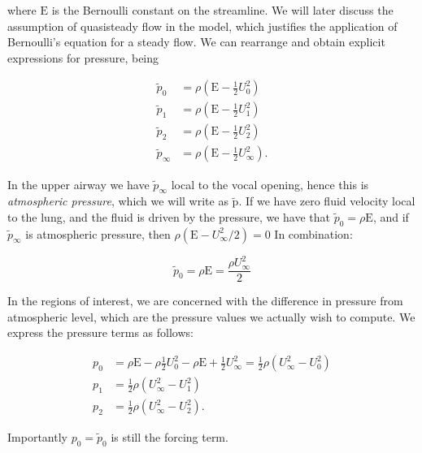 \documentclass{article}
\begin{document}
\noindent where $\mathrm{E}$ is the Bernoulli constant on the streamline.
We will later discuss the assumption of quasisteady flow in the model,
which justifies the application of Bernoulli's equation for a steady flow.
We can rearrange and obtain explicit expressions for pressure, being

\begin{equation}
    \begin{aligned}
        \tilde{p}_0 &= \rho\left(\mathrm{E} - \frac{1}{2}U_0^2\right) \\
        \tilde{p}_1 &= \rho\left(\mathrm{E} - \frac{1}{2}U_1^2\right) \\
        \tilde{p}_2 &= \rho\left(\mathrm{E} - \frac{1}{2}U_2^2\right) \\
        \tilde{p}_\infty &= \rho\left(\mathrm{E} - \frac{1}{2}U_\infty^2\right).
    \end{aligned}
\end{equation}

In the upper airway we have $\tilde{p}_\infty$ local to the vocal opening,
hence this is \textit{atmospheric pressure}, which we will write as \(\mathrm{\tilde{p}}\).
If we have zero fluid velocity local to the lung, and the fluid is driven by the pressure,
we have that $\tilde{p}_0 = \rho \mathrm{E}$,
and if $\tilde{p}_\infty$ is atmospheric pressure, then $\rho(\mathrm{E} - U_\infty^2/2) = 0$
In combination:

\begin{equation}
    \tilde{p}_0 = \rho \mathrm{E} = \frac{\rho U_\infty^2}{2}
\end{equation}


In the regions of interest, we are concerned with the difference in pressure from atmospheric level,
which are the pressure values we actually wish to compute.
We express the pressure terms as follows:

\begin{equation}
    \begin{aligned}
        p_0 &= \rho\mathrm{E} - \rho\frac{1}{2}U_0^2 - \rho\mathrm{E} + \frac{1}{2}U_\infty^2 = \frac{1}{2}\rho\left(U_\infty^2 - U_0^2\right) \\
        p_1 &= \frac{1}{2}\rho\left(U_\infty^2 - U_1^2\right) \\
        p_2 &= \frac{1}{2}\rho\left(U_\infty^2 - U_2^2\right).
    \end{aligned}
\end{equation}

\noindent Importantly \(p_0 = \tilde{p}_0\) is still the forcing term.
\end{document}
